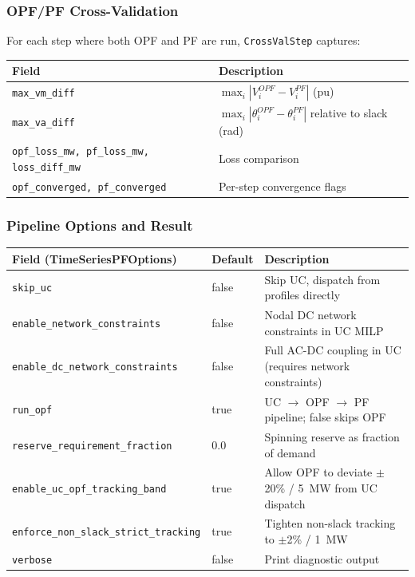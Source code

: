 \subsubsection{OPF/PF Cross-Validation}

For each step where both OPF and PF are run, \texttt{CrossValStep} captures:

\begin{center}
\begin{tabular}{ll}
\hline\hline
\textbf{Field} & \textbf{Description} \\
\hline
\texttt{max\_vm\_diff} & $\max_i|V^{OPF}_i - V^{PF}_i|$ (pu) \\
\texttt{max\_va\_diff} & $\max_i|\theta^{OPF}_i - \theta^{PF}_i|$ relative to slack (rad) \\
\texttt{opf\_loss\_mw, pf\_loss\_mw, loss\_diff\_mw} & Loss comparison \\
\texttt{opf\_converged, pf\_converged} & Per-step convergence flags \\
\hline\hline
\end{tabular}
\end{center}

\subsubsection{Pipeline Options and Result}

\begin{center}
\begin{tabular}{lll}
\hline\hline
\textbf{Field (TimeSeriesPFOptions)} & \textbf{Default} & \textbf{Description} \\
\hline
\texttt{skip\_uc} & false & Skip UC, dispatch from profiles directly \\
\texttt{enable\_network\_constraints} & false & Nodal DC network constraints in UC MILP \\
\texttt{enable\_dc\_network\_constraints} & false & Full AC-DC coupling in UC (requires network constraints) \\
\texttt{run\_opf} & true & UC $\to$ OPF $\to$ PF pipeline; false skips OPF \\
\texttt{reserve\_requirement\_fraction} & 0.0 & Spinning reserve as fraction of demand \\
\texttt{enable\_uc\_opf\_tracking\_band} & true & Allow OPF to deviate $\pm$20\% / 5~MW from UC dispatch \\
\texttt{enforce\_non\_slack\_strict\_tracking} & true & Tighten non-slack tracking to $\pm$2\% / 1~MW \\
\texttt{verbose} & false & Print diagnostic output \\
\hline\hline
\end{tabular}
\end{center}

